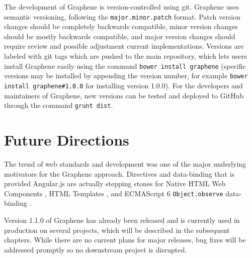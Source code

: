 The development of Graphene is version-controlled using git.
Graphene uses semantic versioning, following the \texttt{major.minor.patch} format.
Patch version changes should be completely backwards compatible, minor version changes should be mostly backwards compatible, and major version changes should require review and possible adjustment current implementations.
Versions are labeled with git tags which are pushed to the main repository, which lets users install Graphene easily using the command \texttt{bower install graphene} (specific versions may be installed by appending the version number, for example \texttt{bower install graphene\#1.0.0} for installing version 1.0.0).
For the developers and maintainers of Graphene, new versions can be tested and deployed to GitHub through the command \texttt{grunt dist}.

\section{Future Directions}
The trend of web standards and development was one of the major underlying motivators for the Graphene approach.
Directives and data-binding that is provided Angular.js are actually stepping stones for Native HTML Web Components \autocite{w3c2014components}, HTML Templates \autocite{w3c2014templating}, and ECMAScript 6 \texttt{Object.observe} data-binding \autocite{polymer2014templating}.

Version 1.1.0 of Graphene has already been released and is currently used in production on several projects, which will be described in the subsequent chapters.
While there are no current plans for major releases, bug fixes will be addressed promptly so no downstream project is disrupted.
